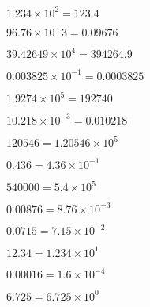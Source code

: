 \documentclass[../Cours.tex]{subfiles}
\begin{document}
\begin{listedexemples}
\begin{multicols}{2}
    \item $\num{1.234} \times 10^2 = \num{123.4}$
    \item $\num{96.76} \times 10^-3 = \num{0.09676}$
    \item $\num{39.42649} \times 10^4 = \num{394264.9}$
    \item $\num{0.003825} \times 10^{-1} = \num{0.0003825}$
    \item $\num{1.9274} \times 10^5 = \num{192740}$
    \item $\num{10.218} \times 10^{-3} = \num{0.010218}$
\end{multicols}
\end{listedexemples}



\begin{listedexemples}
\begin{multicols}{2}
    \item $\num{120546} = \num{1.20546} \times 10^{5}$
    \item $\num{0.436} = \num{4.36} \times 10^{-1}$ 
    \item $\num{540000} = \num{5.4} \times 10^{5}$
    \item $\num{0.00876} = \num{8.76} \times 10^{-3}$ 
    \item $\num{0.0715} = \num{7.15} \times 10^{-2}$ 
    \item $\num{12.34} = \num{1.234} \times 10^{1}$
    \item $\num{0.00016} = \num{1.6} \times 10^{-4}$ 
    \item $\num{6.725} = \num{6.725} \times 10^{0}$
\end{multicols}
\end{listedexemples}

\clearpage
{}
\end{document}
